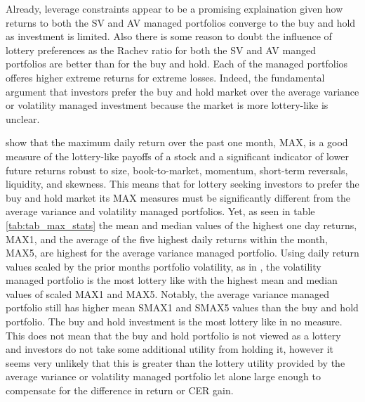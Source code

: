 Already, leverage constraints appear to be a promising explaination given how returns to both the SV and AV managed portfolios converge to the buy and hold as investment is limited. Also there is some reason to doubt the influence of lottery preferences as the Rachev ratio for both the SV and AV manged portfolios are better than for the buy and hold. Each of the managed portfolios offeres higher extreme returns for extreme losses. Indeed, the fundamental argument that investors prefer the buy and hold market over the average variance or volatility managed investment because the market is more lottery-like is unclear.

\citet{bali_maxing_2011} show that the maximum daily return over the past one month, MAX, is a good measure of the lottery-like payoffs of a stock and a significant indicator of lower future returns robust to size, book-to-market, momentum, short-term reversals, liquidity, and skewness. This means that for lottery seeking investors to prefer the buy and hold market its MAX measures must be significantly different from the average variance and volatility managed portfolios. Yet, as seen in table \ref{tab:tab_max_stats} the mean and median values of the highest one day returns, MAX1, and the average of the five highest daily returns within the month, MAX5, are highest for the average variance managed portfolio. Using daily return values scaled by the prior months portfolio volatility, as in \citet{asness_betting_2018}, the volatility managed portfolio is the most lottery like with the highest mean and median values of scaled MAX1 and MAX5. Notably, the average variance managed portfolio still has higher mean SMAX1 and SMAX5 values than the buy and hold portfolio. The buy and hold investment is the most lottery like in no measure. This does not mean that the buy and hold portfolio is not viewed as a lottery and investors do not take some additional utility from holding it, however it seems very unlikely that this is greater than the lottery utility provided by the average variance or volatility managed portfolio let alone large enough to compensate for the difference in return or CER gain.

